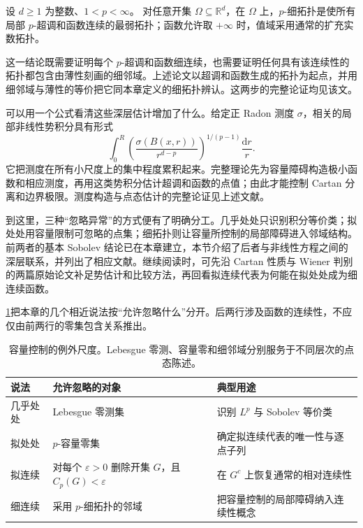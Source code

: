 \begin{theorem}[细拓扑的超调和刻画]\label{b1:thm:p-fine-topology-superharmonic}
设 \(d\geq1\) 为整数、\(1<p<\infty\)。
对任意开集 \(\Omega\subseteq\mathbb R^d\)，在 \(\Omega\) 上，\(p\)-细拓扑是使所有局部 \(p\)-超调和函数连续的最弱拓扑；函数允许取 \(+\infty\) 时，值域采用通常的扩充实数拓扑。
\end{theorem}
\begin{proofsketch}
这一结论既需要证明每个 \(p\)-超调和函数细连续，也需要证明任何具有该连续性的拓扑都包含由薄性刻画的细邻域。上述论文\cite[pp. 293--299 and 3.2. THEOREM]{Heinonen1989Fine}以超调和函数生成的拓扑为起点，并用细邻域与薄性的等价把它同本章定义的细拓扑辨认。这两步的完整论证均见该文。
\end{proofsketch}

可以用一个公式看清这些深层估计增加了什么。给定正 Radon 测度 \(\sigma\)，相关的局部非线性势积分具有形式
\[
 \int_0^R
 \left(\frac{\sigma(B(x,r))}{r^{d-p}}\right)^{1/(p-1)}
 \frac{\mathrm dr}{r}.
\]
它把测度在所有小尺度上的集中程度累积起来。完整理论先为容量障碍构造极小函数和相应测度，再用这类势积分估计超调和函数的点值；由此才能控制 Cartan 分离和边界极限。测度构造与点态估计的完整论证见上述文献。

\ProseParagraphBreak

到这里，三种“忽略异常”的方式便有了明确分工。几乎处处只识别积分等价类；拟处处用容量限制可忽略的点集；细拓扑则让容量所控制的局部障碍进入邻域结构。前两者的基本 Sobolev 结论已在本章建立，本节介绍了后者与非线性方程之间的深层联系，并列出了相应文献。继续阅读时，可先沿 Cartan 性质与 Wiener 判别的两篇原始论文补足势估计和比较方法，再回看拟连续代表为何能在拟处处成为细连续函数。

\ProseParagraphBreak

\cref{b1:tab:capacity-exception-scales}把本章的几个相近说法按“允许忽略什么”分开。后两行涉及函数的连续性，不应仅由前两行的零集包含关系推出。
\begin{table}[htbp]
  \centering
  \caption[容量控制的例外尺度]{容量控制的例外尺度。Lebesgue 零测、容量零和细邻域分别服务于不同层次的点态陈述。}
  \label{b1:tab:capacity-exception-scales}
  \begin{tabularx}{\textwidth}{@{}p{2.8cm}p{4.6cm}X@{}}
    \toprule
    说法 & 允许忽略的对象 & 典型用途 \\
    \midrule
    几乎处处 & Lebesgue 零测集 & 识别 \(L^p\) 与 Sobolev 等价类 \\
    拟处处 & \(p\)-容量零集 & 确定拟连续代表的唯一性与逐点子列 \\
    拟连续 & 对每个 \(\varepsilon>0\) 删除开集 \(G\)，且 \(C_p(G)<\varepsilon\) & 在 \(G^c\) 上恢复通常的相对连续性 \\
    细连续 & 采用 \(p\)-细拓扑的邻域 & 把容量控制的局部障碍纳入连续性概念 \\
    \bottomrule
  \end{tabularx}
\end{table}

